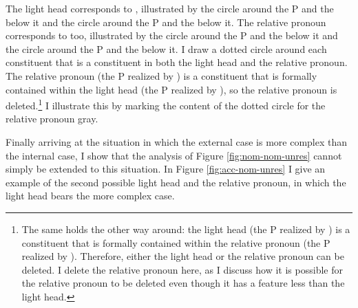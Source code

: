 The light head corresponds to , illustrated by the circle around the P and the  below it and the circle around the P and the  below it. The relative pronoun corresponds to  too, illustrated by the circle around the P and the  below it and the circle around the P and the  below it.
I draw a dotted circle around each constituent that is a constituent in both the light head and the relative pronoun.
The relative pronoun (the P realized by ) is a constituent that is formally contained within the light head (the P realized by ), so the relative pronoun is deleted.\footnote{
The same holds the other way around: the light head (the P realized by ) is a constituent that is formally contained within the relative pronoun (the P realized by ). Therefore, either the light head or the relative pronoun can be deleted. I delete the relative pronoun here, as I discuss how it is possible for the relative pronoun to be deleted even though it has a feature less than the light head.
}
I illustrate this by marking the content of the dotted circle for the relative pronoun gray.

Finally arriving at the situation in which the external case is more complex than the internal case, I show that the analysis of Figure \ref{fig:nom-nom-unres} cannot simply be extended to this situation.
In Figure \ref{fig:acc-nom-unres} I give an example of the second possible light head and the relative pronoun, in which the light head bears the more complex case.

